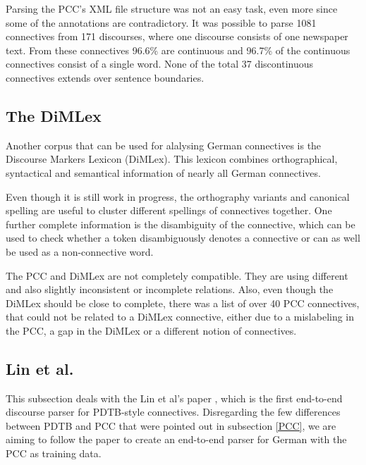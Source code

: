 \documentclass[10pt,a4paper]{article}
\begin{document}
Parsing the PCC's XML file structure was not an easy task, even more since some of the annotations are contradictory. It was possible to parse 1081 connectives from 171 discourses, where one discourse consists of one newspaper text. From these connectives 96.6\% are continuous and 96.7\% of the continuous connectives consist of a single word. None of the total 37 discontinuous connectives extends over sentence boundaries.

\subsection{The DiMLex}

Another corpus that can be used for alalysing German connectives is the Discourse Markers Lexicon (DiMLex). This lexicon combines orthographical, syntactical and semantical information of nearly all German connectives.

Even though it is still work in progress, the orthography variants and canonical spelling are useful to cluster different spellings of connectives together. One further complete information is the disambiguity of the connective, which can be used to check whether a token disambiguously denotes a connective or can as well be used as a non-connective word.

The PCC and DiMLex are not completely compatible. They are using different and also slightly inconsistent or incomplete relations. Also, even though the DiMLex should be close to complete, there was a list of over 40 PCC connectives, that could not be related to a DiMLex connective, either due to a mislabeling in the PCC, a gap in the DiMLex or a different notion of connectives.

\subsection{Lin et al.}

This subsection deals with the Lin et al's paper \cite{Lin12}, which is the first end-to-end discourse parser for PDTB-style connectives. Disregarding the few differences between PDTB and PCC that were pointed out in subsection \ref{PCC}, we are aiming to follow the paper to create an end-to-end parser for German with the PCC as training data.
\end{document}
